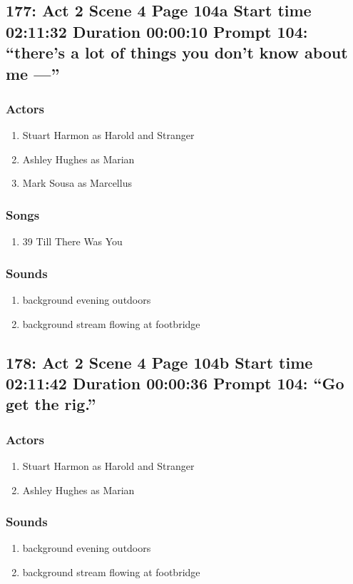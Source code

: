 \subsection{177: Act 2 Scene 4 Page 104a Start time 02:11:32 Duration 00:00:10 Prompt 104: ``there's a lot of things you don't know about me ---''}

\subsubsection{Actors}
\begin{enumerate}
\item Stuart Harmon as Harold and Stranger
\item Ashley Hughes as Marian
\item Mark Sousa as Marcellus
\end{enumerate}

\subsubsection{Songs}
\begin{enumerate}
\item 39 Till There Was You
\end{enumerate}\subsubsection{Sounds}
\begin{enumerate}
\item background evening outdoors
\item background stream flowing at footbridge
\end{enumerate}
\subsection{178: Act 2 Scene 4 Page 104b Start time 02:11:42 Duration 00:00:36 Prompt 104: ``Go get the rig.''}

\subsubsection{Actors}
\begin{enumerate}
\item Stuart Harmon as Harold and Stranger
\item Ashley Hughes as Marian
\end{enumerate}

\subsubsection{Sounds}
\begin{enumerate}
\item background evening outdoors
\item background stream flowing at footbridge
\end{enumerate}
